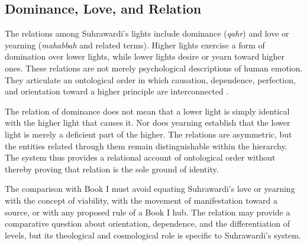 


\subsection{Dominance, Love, and Relation}
\label{sec:ch08-s14-ss10}

\label{para:VS.B01.P01.C08.S14.SS10.P001}

The relations among Suhrawardi's lights include
dominance (\textit{qahr}) and love or yearning
(\textit{mahabbah} and related terms). Higher
lights exercise a form of domination over
lower lights, while lower lights desire or
yearn toward higher ones. These relations
are not merely psychological descriptions
of human emotion. They articulate an
ontological order in which causation,
dependence, perfection, and orientation
toward a higher principle are interconnected
\citep[Part II, §§147--156]{SuhrawardiPhilosophyIllumination}.

\label{para:VS.B01.P01.C08.S14.SS10.P002}

The relation of dominance does not mean that
a lower light is simply identical with the
higher light that causes it. Nor does
yearning establish that the lower light
is merely a deficient part of the higher.
The relations are asymmetric, but the
entities related through them remain
distinguishable within the hierarchy.
The system thus provides a relational
account of ontological order without
thereby proving that relation is the
sole ground of identity.

\label{para:VS.B01.P01.C08.S14.SS10.P003}

The comparison with Book I must avoid
equating Suhrawardi's love or yearning
with the concept of viability, with
the movement of manifestation toward
a source, or with any proposed rule
of a Book I hub. The relation may
provide a comparative question about
orientation, dependence, and the
differentiation of levels, but its
theological and cosmological role
is specific to Suhrawardi's system.

\label{para:VS.B01.P01.C08.S14.SS10.P004}

